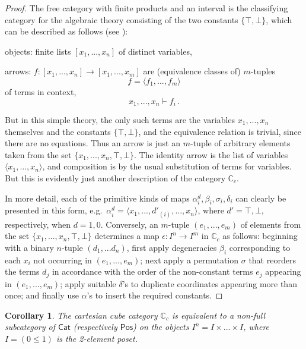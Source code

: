 \documentclass[11pt]{article}
\newcommand{\C}{\ensuremath{\mathbb{C}}}
\newtheorem{corollary}[theorem]{Corollary}
\theoremstyle{remark}
\theoremstyle{definition}
\begin{document}
\begin{proof}
The free category with finite products and an interval is the classifying category for the  algebraic theory consisting of the two constants $\{\top, \bot\}$, which can be described as follows (see \cite{AB}):
\begin{description}
\item objects: finite lists $[x_1, ..., x_n]$ of distinct variables,
\item arrows: $f : [x_1, ..., x_n] \to [x_1, ..., x_m]$ are (equivalence classes of) $m$-tuples $$f = \langle f_1, ..., f_m\rangle$$ of terms in context,
$$x_1, ..., x_n \vdash f_i\,.$$
\end{description}
But in this simple theory, the only such terms are the variables $x_1, ..., x_n$ themselves and the constants $\{\top, \bot\}$, and the equivalence relation is trivial, since there are no equations.  Thus an arrow is just an $m$-tuple of arbitrary elements taken from the set $\{x_1, ..., x_n, \top, \bot\}$.  The identity arrow is the list of variables 
$\langle x_1, ..., x_n \rangle$, and composition is by the usual substitution of terms for variables.  But this is evidently just another description of the category $\C_c$.

In more detail, each of the primitive kinds of maps $\alpha^d_i, \beta_i, \sigma_i, \delta_i$ can clearly be presented in this form, e.g.\ $\alpha^d_i = \langle x_1, ..., d'_{(i)}, ..., x_n\rangle$, where $d' = \top,\bot$, respectively, when $d = 1,0$.  Conversely, an $m$-tuple $(e_1,..., e_m)$ of elements from the set $\{x_1, ..., x_n, \top, \bot\}$ determines a map $\epsilon : I^n \to I^m$ in $\C_c$ as follows: beginning with a binary $n$-tuple $(d_1, ... d_n)$, first apply degeneracies $\beta_i$ corresponding to each $x_i$ not occurring in $(e_1,..., e_m)$; next apply a permutation $\sigma$ that reorders the  terms $d_j$ in accordance with the order of the non-constant terms $e_j$ appearing in $(e_1,..., e_m)$; apply suitable $\delta$'s to duplicate coordinates appearing more than once; and finally use $\alpha$'s to insert the required constants.
\end{proof}

\begin{corollary}
The cartesian cube category $\C_c$ is equivalent to a \emph{non}-full subcategory of $\mathsf{Cat}$ (respectively $\mathsf{Pos}$) on the objects $I^n = I \times ...\times I$, where $I = (0\leq 1)$ is the 2-element poset.
\end{corollary}
\end{document}

